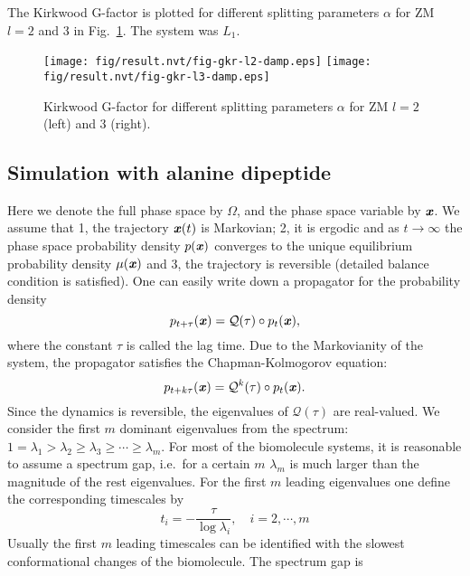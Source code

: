 \documentclass[aip,jcp,a4paper,preprint,unsortedaddress,onecolumn,fleqn]{revtex4-1}
\newcommand{\vect}[1]{\textbf{\textit{#1}}}
\begin{document}
The Kirkwood G-factor is plotted for different splitting parameters $\alpha$ for ZM $l=2$ and 3 in Fig.~\ref{fig:damp-gkr-l23}. 
The system was $L_1$.
\begin{figure}[]
  \centering
  \texttt{[image: fig/result.nvt/fig-gkr-l2-damp.eps]}
  \texttt{[image: fig/result.nvt/fig-gkr-l3-damp.eps]}
  \caption{Kirkwood G-factor for different splitting parameters $\alpha$ for ZM $l=2$ (left) and 3 (right).}
  \label{fig:damp-gkr-l23}
\end{figure}


\subsection{Simulation with alanine dipeptide}

Here we denote the full phase space by $\Omega$, and the phase space
variable by $\vect x$. We assume that 1, the trajectory $\vect x(t)$
is Markovian; 2, it is ergodic and as $t\rightarrow\infty$ the phase
space probability density $p(\vect x)$ converges to the unique
equilibrium probability density $\mu(\vect x)$ and 3, the trajectory
is reversible (detailed balance condition is satisfied). One can
easily write down a propagator for the probability density
\begin{equation}
\label{eq:propagator}  
p_{t+\tau}(\vect x) = \mathcal Q(\tau)\circ
p_t(\vect x),
\end{equation}
where the constant $\tau$ is called the lag time. Due to the
Markovianity of the system, the propagator satisfies the
Chapman-Kolmogorov equation:
\begin{equation}
  \label{eq:chapman}
  p_{t+k\tau}(\vect x) = \mathcal Q^k(\tau)\circ p_t(\vect x).
\end{equation}
Since the dynamics is reversible, the eigenvalues of $\mathcal
Q(\tau)$ are real-valued. We consider the first $m$ dominant
eigenvalues from the spectrum: $1 = \lambda_1 > \lambda_2 \geq
\lambda_3 \geq \cdots \geq \lambda_m$. For most of the biomolecule
systems, it is reasonable to assume a spectrum gap, i.e.~for a certain
$m$ $\lambda_m$ is much larger than the magnitude of the rest
eigenvalues. For the first $m$ leading eigenvalues one define the
corresponding timescales by
\begin{equation}
  \label{eq:timescale}
  t_i = -\frac{\tau}{\log \lambda_i}, \quad i= 2,\cdots, m
\end{equation}
Usually the first $m$ leading timescales can be identified with the
slowest conformational changes of the biomolecule. The spectrum gap is
\end{document}
